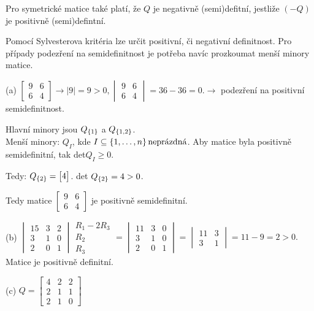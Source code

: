 Pro symetrické matice také platí, že $Q$ je negativně (semi)defitní, jestliže $(-Q)$ je positivně (semi)defintní. \label{matiVlastnost}

Pomocí Sylvesterova kritéria lze určit positivní, či negativní definitnost. Pro případy podezření na semidefinitnost 
je potřeba navíc prozkoumat menší minory matice.

(a) 
$\begin{bmatrix}
    9 & 6 \\
    6 & 4
\end{bmatrix}
\rightarrow |9| = 9 > 0,
\begin{vmatrix}
    9 & 6 \\
    6 & 4
\end{vmatrix} = 36 - 36 = 0.
\rightarrow$ podezření na positivní semidefinitnost.

Hlavní minory jsou $Q_{\left\lbrace 1 \right\rbrace}$ a $Q_{\left\lbrace 1,2 \right\rbrace}$.\\
Menší minory: $Q_I$, kde $I \subseteq \left\lbrace 1, \dots, n \right\rbrace \text{neprázdná}$. Aby matice byla positivně semidefinitní, tak 
det$Q_I \geq 0$.

Tedy: $Q_{\left\lbrace 2 \right\rbrace} = 
\begin{bmatrix}
    4
\end{bmatrix}$. det $Q_{\left\lbrace 2 \right\rbrace} = 4 > 0$.

Tedy matice
$\begin{bmatrix}
    9 & 6 \\
    6 & 4
\end{bmatrix}$ je positivně semidefinitní.

(b) 
$\begin{vmatrix}
    15 & 3 & 2 \\
    3 & 1 & 0 \\
    2 & 0 & 1
\end{vmatrix}
\begin{array}{l}
    R_1 - 2 R_3 \\
    R_2 \\
    R_3
\end{array} = 
\begin{vmatrix}
    11 & 3 & 0 \\
    3 & 1 & 0 \\
    2 & 0 & 1
\end{vmatrix} = 
\begin{vmatrix}
    11 & 3 \\
    3 & 1 
\end{vmatrix} = 11-9 = 2 >0.$ Matice je positivně definitní. 

(c)
$Q = \begin{bmatrix}
    4 & 2 & 2 \\
    2 & 1 & 1 \\
    2 & 1 & 0
\end{bmatrix}$


